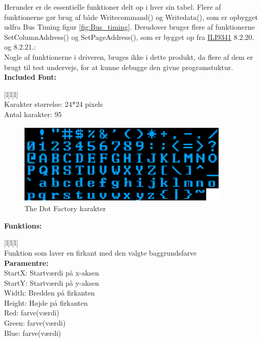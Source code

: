 Herunder er de essentielle funktioner delt op i hver sin tabel. Flere af funktionerne gør brug af både Writecommand() og Writedata(), som er opbygget udfra Bus Timing figur \ref{fig:Bus_timing}. Derudover bruger flere af funktionerne SetColumnAddress() og SetPageAddress(), som er bygget op fra \href{https://blackboard.au.dk/bbcswebdav/pid-1697983-dt-content-rid-3847230_1/courses/BB-Cou-UUVA-73302/BB-Cou-UUVA-65758_ImportedContent_20170106021228/BB-Cou-STADS-UUVA-52360_ImportedContent_20160107025559/LAB/Lab3a%20Graphic%20LCD%20Display/Files%20for%20LAB3a/ILI9341_v1.11.pdf}{ILI9341} 
8.2.20. og 8.2.21.: \\
Nogle af funktionerne i driveren, bruges ikke i dette produkt, da flere af dem er brugt til test undervejs, for at kunne debugge den givne programstuktur.
\newline
\newline
\textbf{\large Included Font:}

\begin{center}
\begin{tabular}{ |l|l|l| }
\hline
{} \\
\hline
Karakter størrelse: 24*24 pixels  \\
Antal karakter: 95\\
\hline

\end{tabular}
\end{center} 
\begin{figure}[H]
	\centering
	\includegraphics[width = 150 pt]{Img/Thedotfactory.png}
	\caption{The Dot Factory karakter}
	\label{fig:Thedotfactory}
\end{figure}

\textbf{\large Funktions:}

\begin{center}
\begin{tabular}{ |l|l|l| }
\hline
{} \\
\hline
Funktion som laver en firkant med den valgte baggrundsfarve  \\
\hline
\textbf{Paramentre:}  \\ StartX: Startværdi på x-aksen \\StartY: Startværdi på y-aksen\\ Width: Bredden på firkanten\\ Height: Højde på firkanten\\ Red: farve(værdi)\\ Green: farve(værdi) \\ Blue: farve(værdi)\\
\hline
\end{tabular}
\end{center} 

